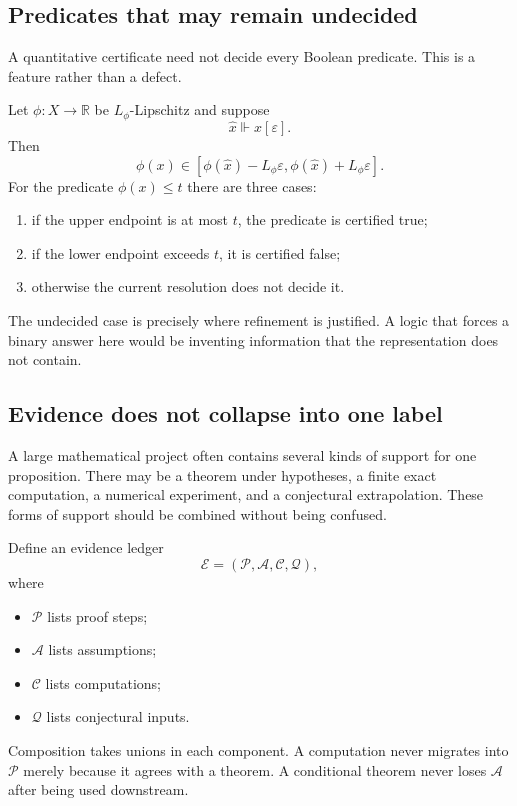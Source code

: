 \documentclass[11pt]{article}
\theoremstyle{definition}
\theoremstyle{remark}
\begin{document}
\subsection{Predicates that may remain undecided}

A quantitative certificate need not decide every Boolean predicate.  This is a feature rather than a defect.

Let $\phi:X\to\mathbb R$ be $L_\phi$-Lipschitz and suppose
\[
   \widehat x\Vdash x[\varepsilon].
\]
Then
\[
   \phi(x)
   \in
   [\phi(\widehat x)-L_\phi\varepsilon,
    \phi(\widehat x)+L_\phi\varepsilon].
\]
For the predicate $\phi(x)\le t$ there are three cases:
\begin{enumerate}[label=\arabic*.]
\item if the upper endpoint is at most $t$, the predicate is certified true;
\item if the lower endpoint exceeds $t$, it is certified false;
\item otherwise the current resolution does not decide it.
\end{enumerate}

The undecided case is precisely where refinement is justified.  A logic that forces a binary answer here would be inventing information that the representation does not contain.

\subsection{Evidence does not collapse into one label}

A large mathematical project often contains several kinds of support for one proposition.  There may be a theorem under hypotheses, a finite exact computation, a numerical experiment, and a conjectural extrapolation.  These forms of support should be combined without being confused.

Define an evidence ledger
\[
   \mathcal E
   =
   (\mathcal P,\mathcal A,\mathcal C,\mathcal Q),
\]
where
\begin{itemize}
\item $\mathcal P$ lists proof steps;
\item $\mathcal A$ lists assumptions;
\item $\mathcal C$ lists computations;
\item $\mathcal Q$ lists conjectural inputs.
\end{itemize}
Composition takes unions in each component.  A computation never migrates into $\mathcal P$ merely because it agrees with a theorem.  A conditional theorem never loses $\mathcal A$ after being used downstream.
\end{document}

